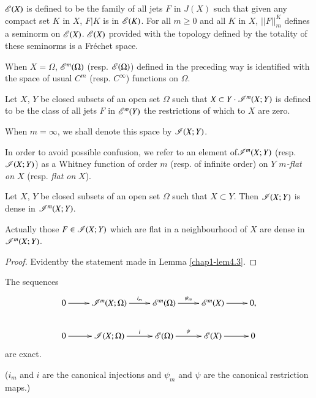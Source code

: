 $\mathscr{E}(X)$ is defined to be the family of all jets $F$ in $J(X)$ such that given any compact set $K$ in $X$, $F|K$ is in $\mathscr{E}(K)$. For all $m\geq 0$ and all $K$ in $X$, $||F||^{K}_{m}$ defines a seminorm on $\mathscr{E}(X)$. $\mathscr{E}(X)$ provided with the topology defined by the totality of these seminorms is a Fr\'echet space.

When $X=\Omega$, $\mathscr{E}^{m}(\Omega)$ (resp. $\mathscr{E}(\Omega)$) defined in the preceding way is identified with the space of usual $C^{m}$ (resp. $C^{\infty}$) functions on $\Omega$.

\begin{definition}\label{chap1-defi5.1}
Let $X$, $Y$ be closed subsets of an open set $\Omega$ such that $X\subset Y\cdot \mathscr{I}^{m}(X;Y)$ is defined to be the class of all jets $F$ in $\mathscr{E}^{m}(Y)$ the restrictions of which to $X$ are zero.

When $m=\infty$, we shall denote this space by $\mathscr{I}(X;Y)$.
\end{definition}

In order to avoid possible confusion, we refer to an element of\break $\mathscr{I}^{m}(X;Y)$ (resp. $\mathscr{I}(X;Y)$) as a Whitney function of order $m$ (resp. of infinite order) on {\em $Y$ $m$-flat on $X$} (resp. {\em flat on} $X$).

\begin{proposition}\label{chap1-prop5.2}
Let $X$, $Y$ be closed subsets of an open set $\Omega$ such that $X\subset Y$. Then $\mathscr{I}(X;Y)$ is dense in $\mathscr{I}^{m}(X;Y)$.
\end{proposition}

Actually those $F\in \mathscr{I}(X;Y)$ which are flat in a neighbourhood of $X$ are dense in $\mathscr{I}^{m}(X;Y)$.

\begin{proof}
Evident\pageoriginale by the statement made in Lemma \ref{chap1-lem4.3}.
\end{proof}

\begin{proposition}\label{chap1-prop5.3}
The sequences
\[
\xymatrix{
0\ar[r] & \scrI^{m}(X;\Omega)\ar[r]^-{i_{m}} & \scrE^{m}(\Omega)\ar[r]^-{\psi_{m}} & \scrE^{m}(X)\ar[r] & 0,\\
0\ar[r] & \scrI(X;\Omega)\ar[r]^-{i} & \scrE(\Omega)\ar[r]^-{\psi} & \scrE(X)\ar[r] & 0
}
\]
are exact.
\end{proposition}

($i_{m}$ and $i$ are the canonical injections and $\psi_{m}$ and $\psi$ are the canonical restriction maps.)

